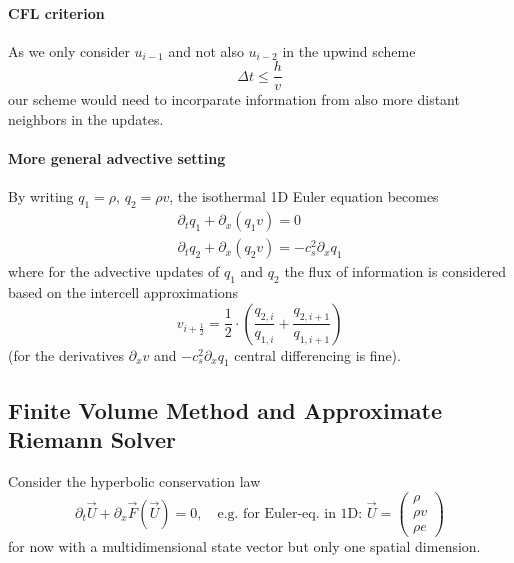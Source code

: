 \paragraph*{CFL criterion} As we only consider $u_{i-1}$ and not also $u_{i-2}$
in the upwind scheme
\begin{equation}
    \Delta t \leq \frac{h}{v}
\end{equation}
our scheme would need to incorparate information from also more distant neighbors
in the updates.

\paragraph*{More general advective setting} By writing $q_1 = \rho$, $q_2 = \rho v$,
the isothermal 1D Euler equation becomes
\begin{equation}
    \begin{gathered}
        \partial_t q_1 + \partial_x (q_1 v) = 0 \\
        \partial_t q_2 + \partial_x (q_2 v) = -c_s^2 \partial_x q_1
    \end{gathered}
\end{equation}
where for the advective updates of $q_1$ and $q_2$ the flux of information
is considered based on the intercell approximations
\begin{equation}
    v_{i+\frac{1}{2}} = \frac{1}{2} \cdot \left( \frac{q_{2,i}}{q_{1,i}} + \frac{q_{2,i+1}}{q_{1,i+1}} \right)
\end{equation}
(for the derivatives $\partial_x v$ and $-c_s^2 \partial_x q_1$ central differencing is fine).

\subsection*{Finite Volume Method and Approximate Riemann Solver}
Consider the hyperbolic conservation law
\begin{equation}
    \partial_t \vec{U} + \partial_x \vec{F}(\vec{U}) = 0, \quad \text{e.g. for Euler-eq. in 1D: } \vec{U} = \begin{pmatrix}
        \rho \\
        \rho v \\
        \rho e
    \end{pmatrix}
\end{equation}
for now with a multidimensional state vector but only one spatial dimension.
